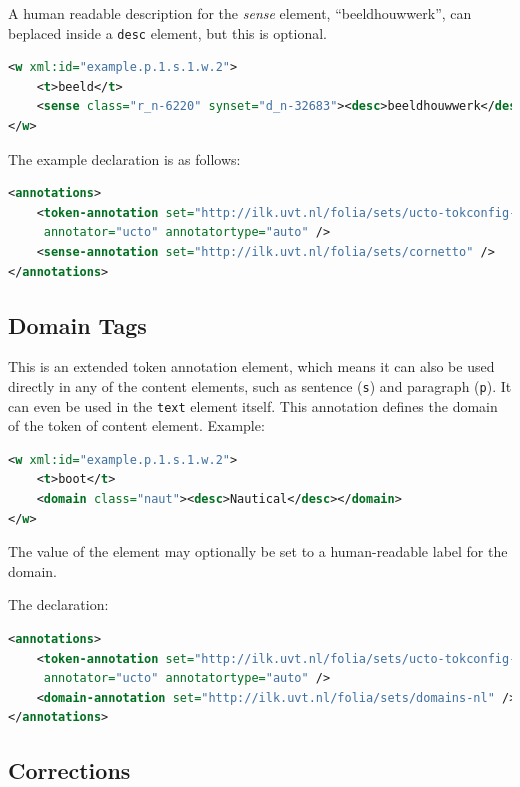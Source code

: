 \documentclass[a4paper,12pt]{report}
\begin{document}
A human readable description for the \emph{sense} element, ``beeldhouwwerk'', can beplaced inside a \texttt{desc} element, but this is optional.

\begin{lstlisting}[language=xml]
<w xml:id="example.p.1.s.1.w.2">
    <t>beeld</t>
    <sense class="r_n-6220" synset="d_n-32683"><desc>beeldhouwwerk</desc></sense>
</w>
\end{lstlisting}

The example declaration is as follows:

\begin{lstlisting}[language=xml]
<annotations>
    <token-annotation set="http://ilk.uvt.nl/folia/sets/ucto-tokconfig-nl"
     annotator="ucto" annotatortype="auto" />
    <sense-annotation set="http://ilk.uvt.nl/folia/sets/cornetto" />
</annotations>
\end{lstlisting}

\subsection{Domain Tags}

This is an extended token annotation element, which means it can also be used directly in any of the content elements, such as sentence (\texttt{s}) and  paragraph (\texttt{p}). It can even be used in the \texttt{text} element itself. This annotation defines the domain of the token of content element. Example:

\begin{lstlisting}[language=xml]
<w xml:id="example.p.1.s.1.w.2">
    <t>boot</t>
    <domain class="naut"><desc>Nautical</desc></domain>
</w>
\end{lstlisting}

The value of the element may optionally be set to a human-readable label for the domain.

The declaration:

\begin{lstlisting}[language=xml]
<annotations>
    <token-annotation set="http://ilk.uvt.nl/folia/sets/ucto-tokconfig-nl"
     annotator="ucto" annotatortype="auto" />
    <domain-annotation set="http://ilk.uvt.nl/folia/sets/domains-nl" />
</annotations>
\end{lstlisting}

\subsection{Corrections}
\end{document}
